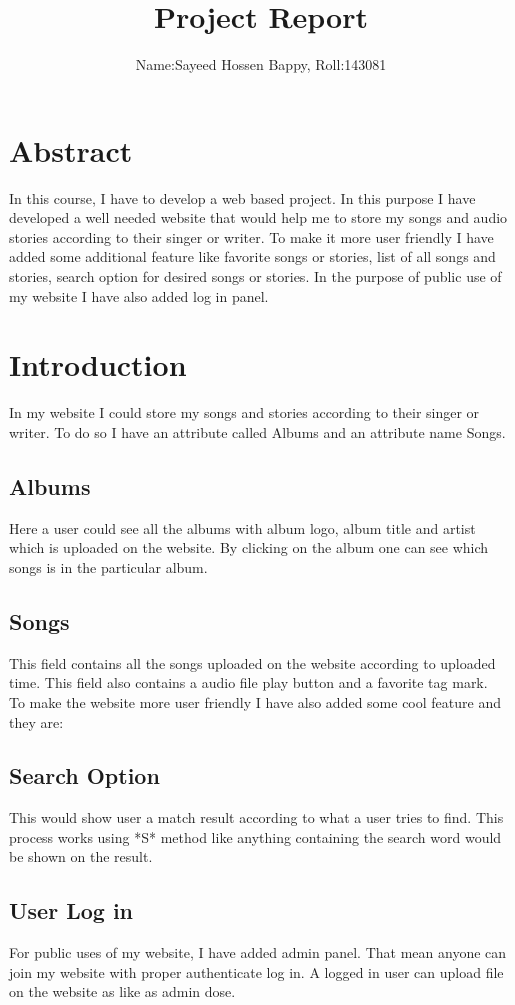 \documentclass[11pt]{article}
\begin{document}
\title{\textbf{Project Report}}
\author{Name:Sayeed Hossen Bappy,  Roll:143081}
\maketitle
\begin{multicols}{2}
\section{Abstract}
In this course, I have to develop a web based project. In this purpose I have developed a well needed website that would help me to store my songs and audio stories according to their singer or writer. To make it more user friendly I have added some additional feature like favorite songs or stories, list of all songs and stories, search option for desired songs or stories. In the purpose of public use of my website I have also added log in panel. 
\section{Introduction}
In my website I could store my songs and stories according to their singer or writer. To do so I have an attribute called Albums and an attribute name Songs.
\subsection{Albums}
Here a user could see all the albums with album logo, album title and artist which is uploaded on the website. By clicking on the album one can see which songs is in the particular album.
\subsection{Songs}
This field contains all the songs uploaded on the website according to uploaded time. This field also contains a audio file play button and a favorite tag mark.
\\To make the website more user friendly I have also added some cool feature and they are:
\subsection{Search Option}
This would show user a match result according to what a user tries to find. This process works using *S* method like anything containing the search word would be shown on the result.
\subsection{User Log in}
For public uses of my website, I have added admin panel. That mean anyone can join my website with proper authenticate log in. A logged in user can upload file on the website as like as admin dose.

\end{multicols}
\end{document}
